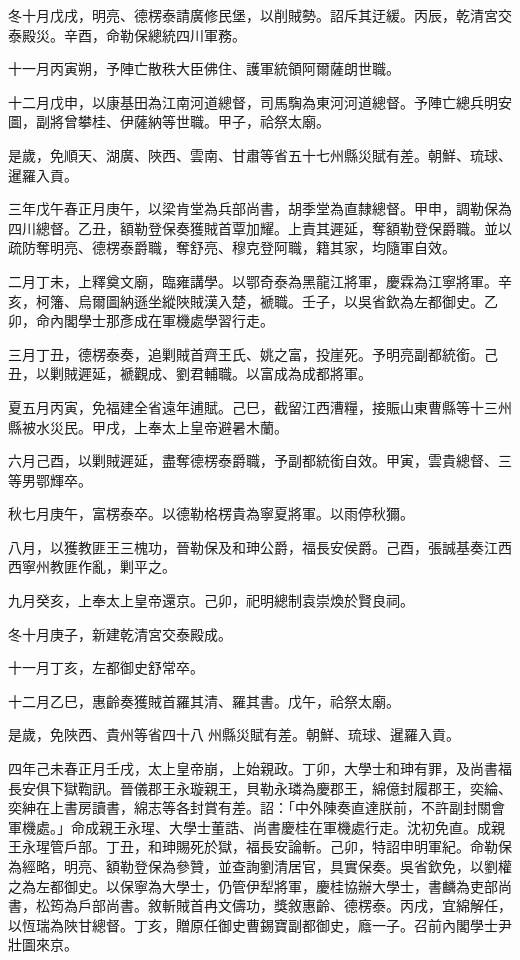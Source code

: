 \begin{pinyinscope}
冬十月戊戌，明亮、德楞泰請廣修民堡，以削賊勢。詔斥其迂緩。丙辰，乾清宮交泰殿災。辛酉，命勒保總統四川軍務。

十一月丙寅朔，予陣亡散秩大臣佛住、護軍統領阿爾薩朗世職。

十二月戊申，以康基田為江南河道總督，司馬騊為東河河道總督。予陣亡總兵明安圖，副將曾攀桂、伊薩納等世職。甲子，祫祭太廟。

是歲，免順天、湖廣、陜西、雲南、甘肅等省五十七州縣災賦有差。朝鮮、琉球、暹羅入貢。

三年戊午春正月庚午，以梁肯堂為兵部尚書，胡季堂為直隸總督。甲申，調勒保為四川總督。乙丑，額勒登保奏獲賊首覃加耀。上責其遲延，奪額勒登保爵職。並以疏防奪明亮、德楞泰爵職，奪舒亮、穆克登阿職，籍其家，均隨軍自效。

二月丁未，上釋奠文廟，臨雍講學。以鄂奇泰為黑龍江將軍，慶霖為江寧將軍。辛亥，柯籓、烏爾圖納遜坐縱陜賊漢入楚，褫職。壬子，以吳省欽為左都御史。乙卯，命內閣學士那彥成在軍機處學習行走。

三月丁丑，德楞泰奏，追剿賊首齊王氏、姚之富，投崖死。予明亮副都統銜。己丑，以剿賊遲延，褫觀成、劉君輔職。以富成為成都將軍。

夏五月丙寅，免福建全省遠年逋賦。己巳，截留江西漕糧，接賑山東曹縣等十三州縣被水災民。甲戌，上奉太上皇帝避暑木蘭。

六月己酉，以剿賊遲延，盡奪德楞泰爵職，予副都統銜自效。甲寅，雲貴總督、三等男鄂輝卒。

秋七月庚午，富楞泰卒。以德勒格楞貴為寧夏將軍。以雨停秋獮。

八月，以獲教匪王三槐功，晉勒保及和珅公爵，福長安侯爵。己酉，張誠基奏江西西寧州教匪作亂，剿平之。

九月癸亥，上奉太上皇帝還京。己卯，祀明總制袁崇煥於賢良祠。

冬十月庚子，新建乾清宮交泰殿成。

十一月丁亥，左都御史舒常卒。

十二月乙巳，惠齡奏獲賊首羅其清、羅其書。戊午，祫祭太廟。

是歲，免陜西、貴州等省四十八州縣災賦有差。朝鮮、琉球、暹羅入貢。

四年己未春正月壬戌，太上皇帝崩，上始親政。丁卯，大學士和珅有罪，及尚書福長安俱下獄鞫訊。晉儀郡王永璇親王，貝勒永璘為慶郡王，綿億封履郡王，奕綸、奕紳在上書房讀書，綿志等各封賞有差。詔：「中外陳奏直達朕前，不許副封關會軍機處。」命成親王永瑆、大學士董誥、尚書慶桂在軍機處行走。沈初免直。成親王永瑆管戶部。丁丑，和珅賜死於獄，福長安論斬。己卯，特詔申明軍紀。命勒保為經略，明亮、額勒登保為參贊，並查詢劉清居官，具實保奏。吳省欽免，以劉權之為左都御史。以保寧為大學士，仍管伊犁將軍，慶桂協辦大學士，書麟為吏部尚書，松筠為戶部尚書。敘斬賊首冉文儔功，獎敘惠齡、德楞泰。丙戌，宜綿解任，以恆瑞為陜甘總督。丁亥，贈原任御史曹錫寶副都御史，廕一子。召前內閣學士尹壯圖來京。


\end{pinyinscope}
